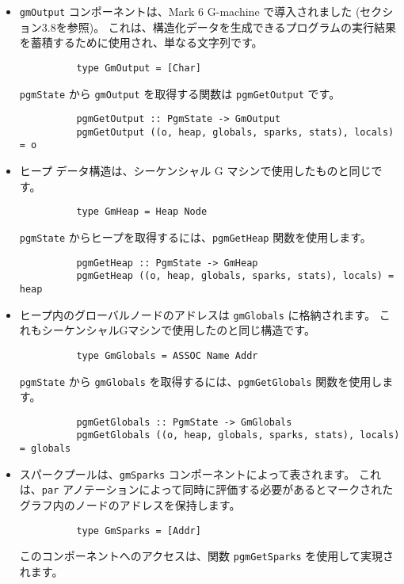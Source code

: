 \documentclass{jarticle}
\begin{document}
\begin{itemize}
	\item \texttt{gmOutput} コンポーネントは、Mark 6 G-machine で導入されました (セクション3.8を参照)。
	      これは、構造化データを生成できるプログラムの実行結果を蓄積するために使用され、単なる文字列です。
	      \begin{verbatim}
          type GmOutput = [Char]
        \end{verbatim}
	      \texttt{pgmState} から \texttt{gmOutput} を取得する関数は \texttt{pgmGetOutput} です。
	      \begin{verbatim}
          pgmGetOutput :: PgmState -> GmOutput
          pgmGetOutput ((o, heap, globals, sparks, stats), locals) = o
        \end{verbatim}
	\item ヒープ データ構造は、シーケンシャル G マシンで使用したものと同じです。
	      \begin{verbatim}
          type GmHeap = Heap Node
        \end{verbatim}
	      \texttt{pgmState} からヒープを取得するには、\texttt{pgmGetHeap} 関数を使用します。
	      \begin{verbatim}
          pgmGetHeap :: PgmState -> GmHeap
          pgmGetHeap ((o, heap, globals, sparks, stats), locals) = heap
        \end{verbatim}
	\item ヒープ内のグローバルノードのアドレスは \texttt{gmGlobals} に格納されます。
	      これもシーケンシャルGマシンで使用したのと同じ構造です。
	      \begin{verbatim}
          type GmGlobals = ASSOC Name Addr
        \end{verbatim}
	      \texttt{pgmState} から \texttt{gmGlobals} を取得するには、\texttt{pgmGetGlobals} 関数を使用します。
	      \begin{verbatim}
          pgmGetGlobals :: PgmState -> GmGlobals
          pgmGetGlobals ((o, heap, globals, sparks, stats), locals) = globals
        \end{verbatim}
	\item スパークプールは、\texttt{gmSparks} コンポーネントによって表されます。
	      これは、\texttt{par} アノテーションによって同時に評価する必要があるとマークされたグラフ内のノードのアドレスを保持します。
	      \begin{verbatim}
          type GmSparks = [Addr]
        \end{verbatim}
	      このコンポーネントへのアクセスは、関数 \texttt{pgmGetSparks} を使用して実現されます。

\end{itemize}
\end{document}

